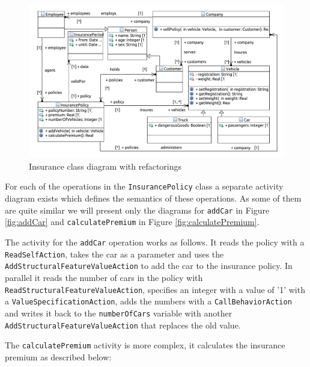 \documentclass{llncs}
\begin{document}
\begin{figure}[h!t]
 \centering
 \includegraphics[scale=0.5]{images/insurance_ref/Model_Model_ClassDiagram}
 \caption{Insurance class diagram with refactorings}
 \label{fig:classdiagramcomplexRef}
\end{figure}

For each of the operations in the \lstinline|InsurancePolicy| class a separate activity diagram exists which defines the semantics 
of these operations. As some of them are quite similar we will present only the diagrams for \lstinline|addCar| in Figure 
\ref{fig:addCar} and \lstinline|calculatePremium| in  Figure \ref{fig:calculatePremium}.

The activity for the \lstinline|addCar| operation works as follows. It reads the policy with a \lstinline|ReadSelfAction|, takes the 
car as a parameter and uses the \lstinline|AddStructuralFeatureValueAction| to add the car to the insurance policy. In parallel 
it reads the number of cars in the policy with \lstinline|ReadStructuralFeatureValueAction|, specifies an integer
with a value of '1' with 
a \lstinline|ValueSpecificationAction|, adds the numbers with a \lstinline|CallBehaviorAction| and writes it back to the 
\lstinline|numberOfCars| variable with another \lstinline|AddStructuralFeatureValueAction| that replaces the old value.

The \lstinline|calculatePremium| activity is more complex, it calculates the insurance premium as described below:
\end{document}
